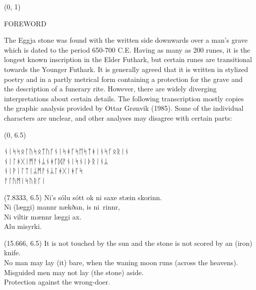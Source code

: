 \documentclass[11pt]{article}
\begin{document}
\begin{textblock}{23}(0, 1)
\begin{center}
\huge FOREWORD
\end{center}
\end{textblock}

\vspace*{0.25\baselineskip}

\begingroup

\begin{center}
The Eggja stone was found with the written side downwards over a man's grave which is dated to the period 650-700 C.E. Having as many as 200 runes, it is the longest known inscription in the Elder Futhark, but certain runes are transitional towards the Younger Futhark. It is generally agreed that it is written in stylized poetry and in a partly metrical form containing a protection for the grave and the description of a funerary rite. However, there are widely diverging interpretations about certain details. The following transcription mostly copies the graphic analysis provided by Ottar Grønvik (1985). Some of the individual characters are unclear, and other analyses may disagree with certain parts:
\rightskip\leftskip
\phantom{text} \hfill \phantom{()}
\end{center}

\begin{textblock}{9.333}(0, 6.5)

\setmainfont{Noto Sans Runic}
ᚾᛁᛋᛋᛟᛚᚢᛋᛟᛏᚢᚴᚾᛁᛋᚼᚴᛋᛖᛋᛏᚼᛁᚾᛋᚴᛟᚱᛁᚾ \\
\hfill \break
ᚾᛁᛚᚼᚷᛁᛗᚨᚾᛦᚾᚼᚴᛞᚨᚾᛁᛋᚾᛁᚦᚱᛁᚾᛦ\\
\hfill \break
ᚾᛁᚹᛁᛚᛏᛁᛦᛗᚨᚾᛦᛚᚼᚷᛁᚼᚴᛋ\\
  \hfill \break
ᚨᛚᚢᛗᛁᛋᚢᚱᚴᛁ\\
\rightskip\leftskip
\phantom{text} \hfill

\end{textblock}

\begin{textblock}{7.333}(7.8333, 6.5)
\setmainfont{Bell MT}
Ni's sólu sótt ok ni saxe stæin skorinn. \\
\hfill \break
Ni (læggi) mannr nækðan, is ni\Thorn \ rinnr, \\
\hfill \break
Ni viltir mænnr læggi ax. \\
\hfill \break
Alu misyrki. \\
\end{textblock}

\begin{textblock}{7.333}(15.666, 6.5)
It is not touched by the sun and the stone is not scored by an (iron) knife. \\
No man may lay (it) bare, when the waning moon runs (across the heavens). \\
Misguided men may not lay (the stone) aside. \\
\hfill \break
Protection against the wrong-doer.
\end{textblock}
\end{document}
